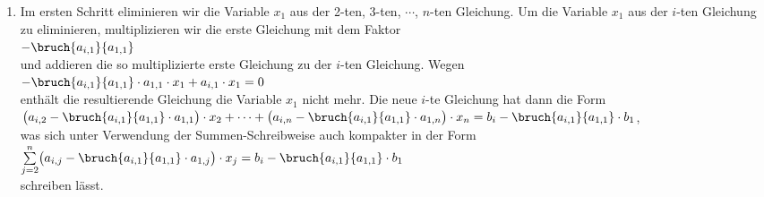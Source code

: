 \begin{enumerate}
\item Im ersten Schritt eliminieren wir die Variable $x_1$ aus der 2-ten, 3-ten, $\cdots$, $n$-ten
      Gleichung.  Um die Variable $x_1$ aus der $i$-ten Gleichung zu eliminieren, multiplizieren 
      wir die erste Gleichung mit dem Faktor
      \\[0.2cm]
      \hspace*{1.3cm}
      $-\bruch{a_{i,1}}{a_{1,1}}$
      \\[0.2cm]
      und addieren die so multiplizierte erste Gleichung zu der $i$-ten Gleichung.  Wegen
      \\[0.2cm]
      \hspace*{1.3cm}
      $-\bruch{a_{i,1}}{a_{1,1}} \cdot a_{1,1} \cdot x_1 + a_{i,1} \cdot x_1 = 0$
      \\[0.2cm]
      enthält die resultierende Gleichung die Variable $x_1$ nicht mehr.  Die neue $i$-te Gleichung
      hat dann die Form
      \\[0.2cm]
      \hspace*{1.3cm}
      $\bigl(a_{i,2} - \bruch{a_{i,1}}{a_{1,1}} \cdot a_{1,1}\bigr) \cdot x_2 + \cdots + 
       \bigl(a_{i,n} - \bruch{a_{i,1}}{a_{1,1}} \cdot a_{1,n}\bigr) \cdot x_n =
       b_{i} - \bruch{a_{i,1}}{a_{1,1}} \cdot b_{1}
      $,
      \\[0.2cm]
      was sich unter Verwendung der Summen-Schreibweise auch kompakter in der Form
      \\[0.2cm]
      \hspace*{1.3cm}
      $\sum\limits_{j=2}^n \bigl(a_{i,j} - \bruch{a_{i,1}}{a_{1,1}} \cdot a_{1,j}\bigr) \cdot x_j =
       b_{i} - \bruch{a_{i,1}}{a_{1,1}} \cdot b_{1}
      $
      \\[0.2cm]
      schreiben lässt.


\end{enumerate}
